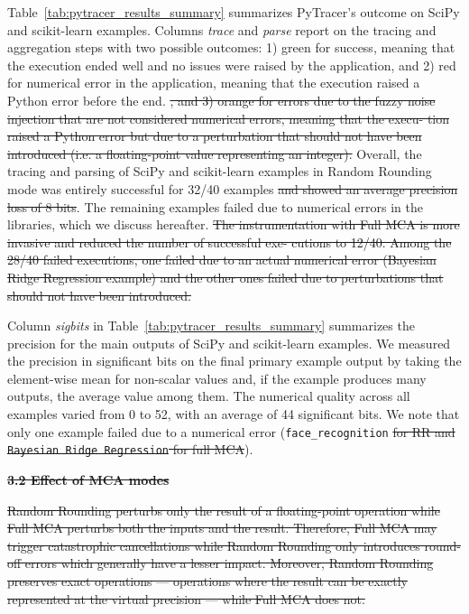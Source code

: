 \documentclass[10pt,journal,compsoc]{IEEEtran}
\newcommand{\pytracer}[0]{PyTracer\xspace}
\DeclareRobustCommand{\remove}[1]{\textcolor{lightred}{\sout{#1}}}
\DeclareRobustCommand{\remove}[1]{}
\begin{document}
Table~\ref{tab:pytracer_results_summary} summarizes \pytracer's outcome on SciPy
and scikit-learn examples. Columns \textit{trace} and \textit{parse} report on
the tracing and aggregation steps with two possible outcomes: 1) green for
success, meaning that the execution ended well and no issues were raised by the
application, and 2) red for numerical error in the application, meaning that the
execution raised a Python error before the end. \remove{, and 3)
    orange for errors due to the fuzzy noise injection that are
    not considered numerical errors, meaning that the execu-
    tion raised a Python error but due to a perturbation that
    should not have been introduced (i.e. a floating-point value
    representing an integer).}
Overall, the tracing and parsing of SciPy and scikit-learn examples in Random
Rounding mode was entirely successful for 32/40 examples\remove{ and showed an average
    precision loss of 8 bits}. The remaining examples failed due to numerical errors
in the libraries, which we discuss hereafter. 
\remove{The instrumentation with Full MCA is
    more invasive and reduced the number of successful exe-
    cutions to 12/40. Among the 28/40 failed executions, one
    failed due to an actual numerical error (Bayesian Ridge
    Regression example) and the other ones failed due to
    perturbations that should not have been introduced.}

Column \textit{sigbits} in Table~\ref{tab:pytracer_results_summary} summarizes
the precision for the main outputs of SciPy and scikit-learn examples. We
measured the precision in significant bits on the final primary example output
by taking the element-wise mean for non-scalar values and, if the example
produces many outputs, the average value among them. The numerical
quality across all examples varied from 0 to 52, with an average of 44
significant bits. We note that only one example failed due to a
numerical error (\texttt{face\_recognition}
\remove{for RR and \texttt{Bayesian Ridge Regression} for full MCA}).

\noindent \remove{\textbf{3.2 Effect of MCA modes}}

\remove{
    Random Rounding perturbs only the result of a floating-point operation while
    Full MCA perturbs both the inputs and the result. Therefore, Full MCA may
    trigger catastrophic cancellations while Random Rounding only introduces
    round-off errors which generally have a lesser impact. Moreover, Random Rounding
    preserves exact operations --- operations where the result can be exactly
    represented at the virtual precision --- while Full MCA does not.}
\end{document}
